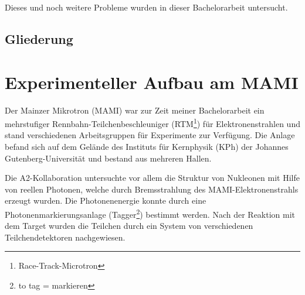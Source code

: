 \documentclass[a4paper,11pt,oneside,final,german,openbib,pdftex]{scrbook}
\begin{document}
{Dieses und noch weitere Probleme wurden in dieser Bachelorarbeit untersucht.
	\newline	 
	
	
\section{Gliederung}






\chapter{Experimenteller Aufbau am MAMI}





Der Mainzer Mikrotron (MAMI) war zur Zeit meiner Bachelorarbeit ein mehrstufiger Rennbahn-Teilchenbeschleuniger (RTM\footnote{Race-Track-Microtron}) für Elektronenstrahlen und stand verschiedenen Arbeitsgruppen
 für Experimente zur Verfügung. Die Anlage befand sich auf dem Gelände des Instituts für Kernphysik (KPh) der Johannes Gutenberg-Universität 
und bestand aus mehreren Hallen.

Die A2-Kollaboration untersuchte vor allem die Struktur von Nukleonen mit Hilfe von reellen Photonen, welche durch Bremsstrahlung des MAMI-Elektronenstrahls erzeugt wurden. Die Photonenenergie konnte durch eine Photonenmarkierungsanlage (Tagger\footnote{to tag = markieren}) bestimmt werden. Nach der Reaktion mit dem Target wurden die Teilchen durch ein System von verschiedenen Teilchendetektoren nachgewiesen.

}
\end{document}
